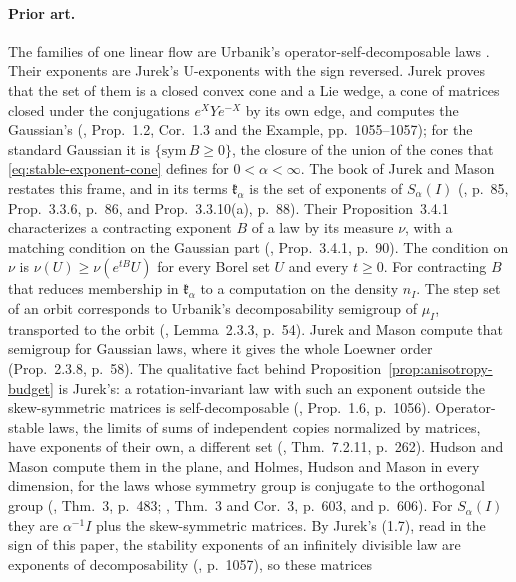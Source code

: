 \paragraph{Prior art.} The families of one linear flow are Urbanik's operator-self-decomposable laws
. Their exponents are Jurek's U-exponents with the sign reversed. Jurek proves
that the set of them is a closed convex cone and a Lie wedge, a cone of matrices closed under the
conjugations $e^{X}Ye^{-X}$ by its own edge, and computes the Gaussian's
(, Prop.~1.2, Cor.~1.3 and the Example, pp.~1055--1057); for the standard
Gaussian it is $\{\mathrm{sym}\,B \ge 0\}$, the closure of the union of the cones that \ref{eq:stable-exponent-cone} defines for
$0 < \alpha < \infty$. The book of Jurek and Mason
restates this frame, and in its terms $\mathfrak k_\alpha$ is the set of exponents of $S_\alpha(I)$
(, p.~85, Prop.~3.3.6, p.~86, and Prop.~3.3.10(a), p.~88). Their
Proposition~3.4.1 characterizes a contracting exponent $B$ of a law by its \Levy{} measure $\nu$, with
a matching condition on the Gaussian part (, Prop.~3.4.1, p.~90). The
condition on $\nu$ is $\nu(U) \ge \nu(e^{tB}U)$ for every Borel set $U$ and every $t \ge 0$. For
contracting $B$ that reduces membership in $\mathfrak k_\alpha$ to a computation on the density $n_I$. The step set of an orbit corresponds to Urbanik's decomposability
semigroup of $\mu_I$, transported to the orbit (, Lemma~2.3.3, p.~54). Jurek
and Mason compute that semigroup for Gaussian laws, where it gives the whole Loewner order
(Prop.~2.3.8, p.~58). The qualitative
fact behind Proposition~\ref{prop:anisotropy-budget} is Jurek's: a rotation-invariant law with such an
exponent outside the skew-symmetric matrices is self-decomposable (,
Prop.~1.6, p.~1056). Operator-stable laws, the limits of sums of independent copies normalized by matrices, have
exponents of their own, a different set
(, Thm.~7.2.11, p.~262). Hudson and Mason compute them in the plane, and
Holmes, Hudson and Mason in every dimension, for the laws whose symmetry group is conjugate to the
orthogonal group (, Thm.~3, p.~483; , Thm.~3 and
Cor.~3, p.~603, and p.~606). For $S_\alpha(I)$ they are $\alpha^{-1}I$ plus the skew-symmetric
matrices. By Jurek's (1.7), read in the sign of this paper, the stability exponents of an infinitely
divisible law are exponents of decomposability (, p.~1057), so these matrices
